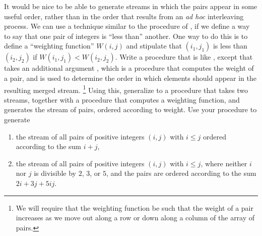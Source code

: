 \begin{exercise}
	\label{Exercise 3.70}
	It would be nice to be able to generate streams in which the pairs appear in some useful order, rather than in the order that results from an \emph{ad hoc} interleaving process.
	We can use a technique similar to the  procedure of , if we define a way to say that one pair of integers is “less than” another.
	One way to do this is to define a “weighting function” \( W(i, j) \) and stipulate that \( (i_1, j_1) \) is less than \( (i_2, j_2) \) if \( W(i_1, j_1) < W(i_2, j_2) \).
	Write a procedure  that is like , except that  takes an additional argument , which is a procedure that computes the weight of a pair, and is used to determine the order in which elements should appear in the resulting merged stream.%
	\footnote{
		We will require that the weighting function be such that the weight of a pair increases as we move out along a row or down along a column of the array of pairs.
	}
	Using this, generalize  to a procedure  that takes two streams, together with a procedure that computes a weighting function, and generates the stream of pairs, ordered according to weight.
	Use your procedure to generate
	\begin{enumerate}[label = \alph*., leftmargin = *]

		\item
			the stream of all pairs of positive integers \( (i, j) \) with \( i ≤ j \) ordered according to the sum \( i + j \),

		\item
			the stream of all pairs of positive integers \( (i, j) \) with \( i ≤ j \), where neither \( i \) nor \( j \) is divisible by \( 2 \), \( 3 \), or \( 5 \), and the pairs are ordered according to the sum \( 2i + 3j + 5ij \).

	\end{enumerate}
\end{exercise}



